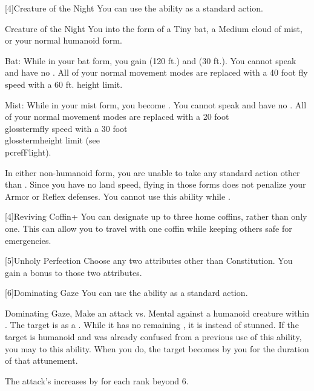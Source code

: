         [4]{Creature of the Night} You can use the  ability as a standard action.
        \begin{magicalattuneability}{Creature of the Night}{}
            \rankline
            You  into the form of a Tiny bat, a Medium cloud of mist, or your normal humanoid form.
            \begin{raggeditemize}
                \item Bat: While in your bat form, you gain  (120 ft.) and  (30 ft.).
                    You cannot speak and have no .
                    All of your normal movement modes are replaced with a 40 foot fly speed with a 60 ft. height limit.
                \item Mist: While in your mist form, you become .
                    You cannot speak and have no .
                    All of your normal movement modes are replaced with a 20 foot \\glossterm{fly speed} with a 30 foot \\glossterm{height limit} (see \\pcref{Flight}).
            \end{raggeditemize}

            In either non-humanoid form, you are unable to take any standard action other than .
            Since you have no land speed, flying in those forms does not penalize your Armor or Reflex defenses.
            You cannot use this ability while \paralyzed.
        \end{magicalattuneability}

        [4]{Reviving Coffin+} You can designate up to three home coffins, rather than only one.
        This can allow you to travel with one coffin while keeping others safe for emergencies.

        [5]{Unholy Perfection} Choose any two attributes other than Constitution.
        You gain a  bonus to those two attributes.

        [6]{Dominating Gaze} You can use the  ability as a standard action.
        \begin{magicalactiveability}{Dominating Gaze}{, }
            \rankline
            Make an attack vs. Mental against a humanoid creature within \shortrange.
            \hit The target is \stunned as a .
            While it has no remaining , it is \confused instead of stunned.
            \crit If the target is humanoid and was already confused from a previous use of this ability, you may  to this ability.
            When you do, the target becomes \dominated by you for the duration of that attunement.

            \rankline
            The attack's  increases by  for each rank beyond 6.
        \end{magicalactiveability}

